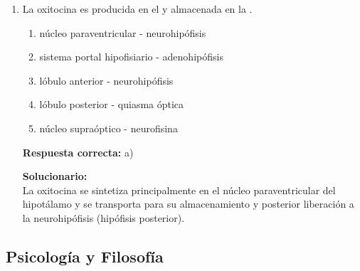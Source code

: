 \begin{enumerate}
	\vspace{2mm}
	\textbf{Solucionario:}\\
	I(F): El colédoco se forma por la unión del conducto cístico y el hepático común.\\
	II(V): El hígado produce bilis. \\
	III(F): Se sintetizan a partir del colesterol. \\
	IV(V): La vesícula almacena la bilis. \\
	V(V): La emulsificación facilita la digestión de grasas.
	
	\vspace{6mm}
	
	\item La oxitocina es producida en el \underline{\hspace{3cm}} y almacenada en la \underline{\hspace{3cm}}.
	\begin{enumerate}[label=\alph*)]
		\item núcleo paraventricular - neurohipófisis
		\item sistema portal hipofisiario - adenohipófisis
		\item lóbulo anterior - neurohipófisis
		\item lóbulo posterior - quiasma óptica
		\item núcleo supraóptico - neurofisina
	\end{enumerate}
	\textbf{Respuesta correcta:} a)
	
	\vspace{2mm}
	\textbf{Solucionario:}\\
	La oxitocina se sintetiza principalmente en el núcleo paraventricular del hipotálamo y se transporta para su almacenamiento y posterior liberación a la neurohipófisis (hipófisis posterior).
	
	\vspace{6mm}
	
	
	
	
	
\end{enumerate}



\subsection*{Psicología y Filosofía}

